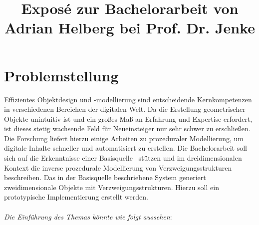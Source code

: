 \documentclass[11pt]{article}
\title{\textbf{Exposé} zur Bachelorarbeit von Adrian Helberg bei Prof. Dr. Jenke}
\begin{document}
    \maketitle

    \section{Problemstellung}

    Effizientes Objektdesign und -modellierung sind entscheidende Kernkompetenzen in verschiedenen Bereichen der
    digitalen Welt.
    Da die Erstellung geometrischer Objekte unintuitiv ist und ein großes Maß an Erfahrung und Expertise
    erfordert, ist dieses stetig wachsende Feld für Neueinsteiger nur sehr schwer zu erschließen.
    Die Forschung liefert hierzu einige Arbeiten zu prozeduraler Modellierung, um digitale Inhalte schneller und
    automatisiert zu erstellen.
    Die Bachelorarbeit soll sich auf die Erkenntnisse einer Basisquelle~\cite{basisquelle} stützen und im
    dreidimensionalen Kontext die inverse prozedurale Modellierung von Verzweigungsstrukturen beschreiben.
    Das in der Basisquelle beschriebene System generiert zweidimensionale Objekte mit Verzweigungsstrukturen.
    Hierzu soll ein prototypische Implementierung erstellt werden.\\~\\
    \textit{Die Einführung des Themas könnte wie folgt aussehen}:
\end{document}
